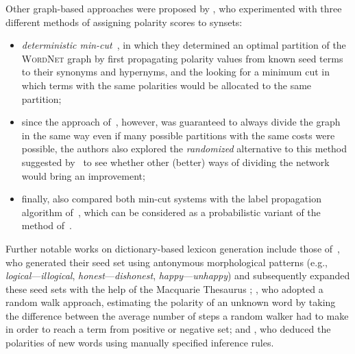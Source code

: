 Other graph-based approaches were proposed by \citet{Rao:09}, who
experimented with three different methods of assigning polarity scores
to synsets:
\begin{itemize}
\item\emph{deterministic min-cut}~\cite{Blum:01}, in which they
  determined an optimal partition of the \textsc{WordNet} graph by
  first propagating polarity values from known seed terms to their
  synonyms and hypernyms, and the looking for a minimum cut in which
  terms with the same polarities would be allocated to the same
  partition;
\item since the approach of~\citet{Blum:01}, however, was guaranteed
  to always divide the graph in the same way even if many possible
  partitions with the same costs were possible, the authors also
  explored the \emph{randomized} alternative to this method suggested
  by~\citet{Blum:04} to see whether other (better) ways of dividing
  the network would bring an improvement;
\item finally, \citet{Rao:09} also compared both min-cut systems with
  the label propagation algorithm of~\citet{Zhu:02}, which can be
  considered as a probabilistic variant of the method
  of~\citet{Blair-Goldensohn:08}.
\end{itemize}

Further notable works on dictionary-based lexicon generation include
those of~\citet{Mohammad:09}, who generated their seed set using
antonymous morphological patterns (e.g.,
\emph{logical}---\emph{illogical}, \emph{honest}---\emph{dishonest},
\emph{happy}---\emph{unhappy}) and subsequently expanded these seed
sets with the help of the Macquarie Thesaurus \cite{Bernard:86};
\citet{Awadallah:10}, who adopted a random walk approach, estimating
the polarity of an unknown word by taking the difference between the
average number of steps a random walker had to make in order to reach
a term from positive or negative set; and \citet{Dragut:10}, who
deduced the polarities of new words using manually specified inference
rules.


